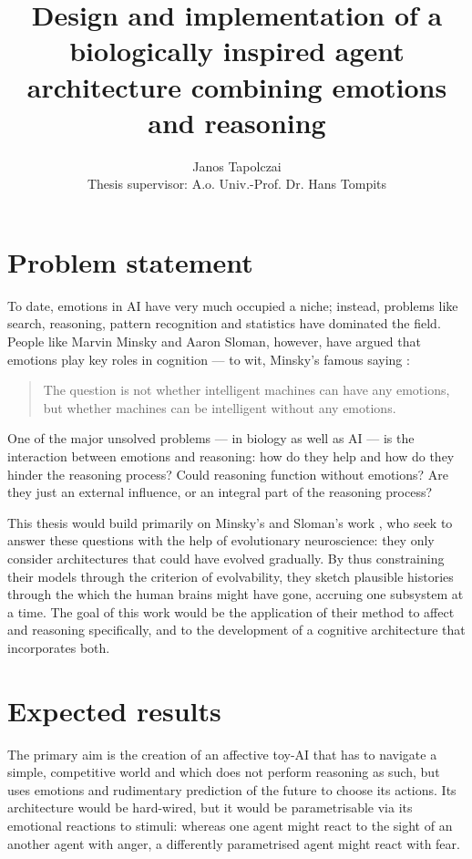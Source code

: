 \documentclass[bibliography=totoc ]{scrartcl}
\title{{\huge Design and implementation of a biologically inspired agent architecture combining emotions and reasoning}}
\author{Janos Tapolczai\\Thesis supervisor: A.o. Univ.-Prof. Dr. Hans Tompits}
\begin{document}
\maketitle

\section{Problem statement}

To date, emotions in AI have very much occupied a niche; instead, problems like search, reasoning, pattern recognition and statistics have dominated the field. People like Marvin Minsky and Aaron Sloman, however, have argued that emotions play key roles in cognition --- to wit, Minsky's famous saying \cite[p. 163]{societyOfMind}:

\begin{quote}
The question is not whether intelligent machines can have any emotions, but whether machines can be intelligent without any emotions.
\end{quote}

One of the major unsolved problems --- in biology as well as AI --- is the interaction between emotions and reasoning: how do they help and how do they hinder the reasoning process? Could reasoning function without emotions? Are they just an external influence, or an integral part of the reasoning process?

This thesis would build primarily on Minsky's \cite{societyOfMind, emotionMachine} and Sloman's work \cite{slomanNiche}, who seek to answer these questions with the help of evolutionary neuroscience: they only consider architectures that could have evolved gradually. By thus constraining their models through the criterion of evolvability, they sketch plausible histories through the which the human brains might have gone, accruing one subsystem at a time. The goal of this work would be the application of their method to affect and reasoning specifically, and to the development of a cognitive architecture that incorporates both.

\section{Expected results}

The primary aim is the creation of an affective toy-AI that has to navigate a simple, competitive world and which does not perform reasoning as such, but uses emotions and rudimentary prediction of the future to choose its actions. Its architecture would be hard-wired, but it would be parametrisable via its emotional reactions to stimuli: whereas one agent might react to the sight of an another agent with anger, a differently parametrised agent might react with fear.
\end{document}
